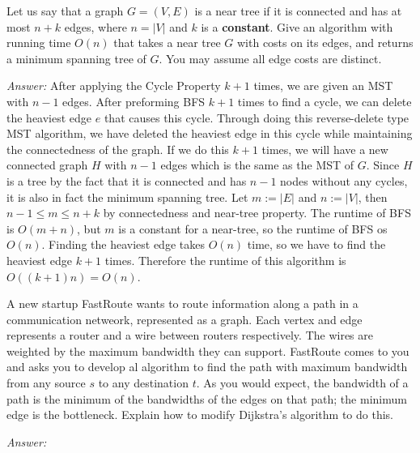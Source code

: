 \documentclass[12pt]{article}
\newenvironment{problem}[2][Problem]{\begin{trivlist}
\item[\hskip \labelsep {\bfseries #1}\hskip \labelsep {\bfseries #2.}]}{\end{trivlist}}
\begin{document}
\begin{problem}{2}
    Let us say that a graph $G=(V,E)$ is a near tree if it is connected and has at most $n+k$ edges, where $n=|V|$ and $k$ is a \textbf{constant}. Give an algorithm with running time $O(n)$ that takes a near tree $G$ with costs on its edges, and returns a minimum spanning tree of $G$. You may assume all edge costs are distinct.
\end{problem}
\textit{Answer:}
After applying the Cycle Property $k+1$ times, we are given an MST with $n-1$ edges. After preforming BFS $k+1$ times to find a cycle, we can delete the heaviest edge $e$ that causes this cycle. Through doing this reverse-delete type MST algorithm, we have deleted the heaviest edge in this cycle while maintaining the connectedness of the graph. If we do this $k+1$ times, we will have a new connected graph $H$ with $n-1$ edges which is the same as the MST of $G$. Since $H$ is a tree by the fact that it is connected and has $n-1$ nodes without any cycles, it is also in fact the minimum spanning tree. Let $m:=|E|$ and $n:=|V|$, then $n-1 \leq m \leq n+k$ by connectedness and near-tree property. The runtime of BFS is $O(m+n)$, but $m$ is a constant for a near-tree, so the runtime of BFS os $O(n)$. Finding the heaviest edge takes $O(n)$ time, so we have to find the heaviest edge $k+1$ times. Therefore the runtime of this algorithm is $O((k+1)n) = O(n)$.
\begin{problem}{3}
    A new startup FastRoute wants to route information along a path in a communication netweork, represented as a graph. Each vertex and edge represents a router and a wire between routers respectively. The wires are weighted by the maximum bandwidth they can support. FastRoute comes to you and asks you to develop al algorithm to find the path with maximum bandwidth from any source $s$ to any destination $t$. As you would expect, the bandwidth of a path is the minimum of the bandwidths of the edges on that path; the minimum edge is the bottleneck. Explain how to modify Dijkstra's algorithm to do this.
\end{problem}
\textit{Answer:}
\end{document}
